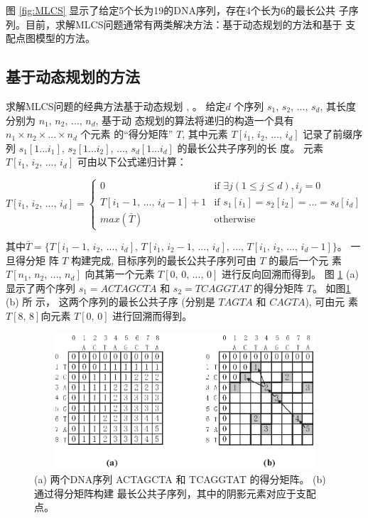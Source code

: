 图 \ref{fig:MLCS} 显示了给定5个长为19的DNA序列，存在4个长为6的最长公共
子序列。目前，求解MLCS问题通常有两类解决方法：基于动态规划的方法和基于
支配点图模型的方法。

\subsection{基于动态规划的方法}

求解MLCS问题的经典方法基于动态规划 \cite{Smith1981}, \cite{Sankoff1972}。 给定$d$
个序列 $s_1,\, s_2,\,...,\, s_d$, 其长度分别为 $n_1,\, n_2,\, ...,\, n_d$, 基于动
态规划的算法将递归的构造一个具有 $n_1 \times n_2 \times ... \times n_d$ 个元素
的“得分矩阵” $T$, 其中元素 $T[i_1,\, i_2,\, ...,\, i_d]$ 记录了前缀序
列 $s_1[1...i_1]$, $s_2[1...i_2]$, ..., $s_d[1...i_d]$ 的最长公共子序列的长
度。 元素 $T[i_1,\, i_2,\, ...,\, i_d]$ 可由以下公式递归计算：

\begin{equation}
  T[i_1,\, i_2,\, ...,\, i_d] =
  \begin{cases}
    0 & \text{if $\exists j(1 \leq j \leq d), i_j = 0$}\\
    T[i_1-1,\, ...,\, i_d-1] + 1  & \text{if $s_1[i_1] = s_2[i_2] =
      ... = s_d[i_d]$}\\
    max(\bar{T}) & \text{otherwise}
  \end{cases}
\end{equation}

其中$\bar{T} = \{T[i_1-1,\, i_2,\, ...,\, i_d],\, T[i_1,\, i_2-1,\,
...,\, i_d],\, ...,\, T[i_1,\, i_2,\, ...,\, i_d-1]\}$。 一旦得分矩
阵 $T$ 构建完成, 目标序列的最长公共子序列可由 $T$ 的最后一个元
素 $T[n_1,\, n_2,\, ...,\, n_d]$ 向其第一个元素 $T[0,\, 0,\, ...,\,
0]$ 进行反向回溯而得到。 图 \ref{fig:DM} (a) 显示了两个序列 $s_1 =
ACTAGCTA$ 和 $s_2 = TCAGGTAT$ 的得分矩阵 $T$。 如图\ref{fig:DM} (b) 所
示， 这两个序列的最长公共子序 (分别是 $TAGTA$ 和 $CAGTA$), 可由元
素 $T[8,\, 8]$向元素 $T[0,\, 0]$ 进行回溯而得到。

\begin{figure}[!h]
  \centering
  \includegraphics[height=2in, width=4.5in]{figures/1_Introduction/score_table}
  \vspace{1em}
  \caption{(a) 两个DNA序列 ACTAGCTA 和 TCAGGTAT 的得分矩阵。 (b) 通过得分矩阵构建
    最长公共子序列，其中的阴影元素对应于支配点。}
\label{fig:DM}
\end{figure}

